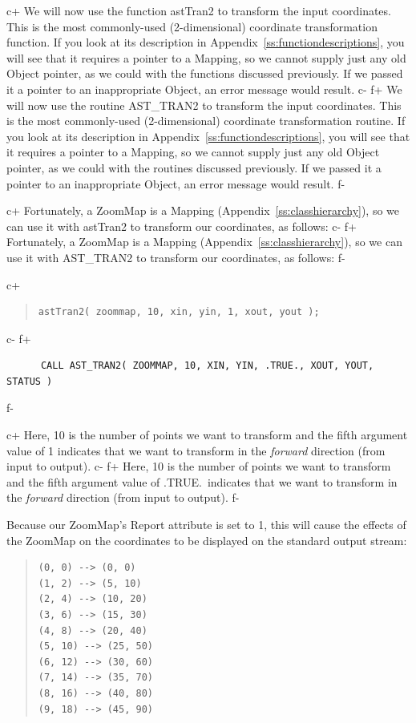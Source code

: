 \documentclass[twoside,11pt]{article}
\newcommand{\appref}[1]{Appendix~\ref{#1}}
\newcommand{\appref}[1]{\ref{#1}}
\begin{document}
c+
We will now use the function astTran2 to transform the input
coordinates. This is the most commonly-used (2-dimensional) coordinate
transformation function. If you look at its description in
\appref{ss:functiondescriptions}, you will see that it requires a
pointer to a Mapping, so we cannot supply just any old Object pointer,
as we could with the functions discussed previously. If we passed it a
pointer to an inappropriate Object, an error message would result.
c-
f+
We will now use the routine AST\_TRAN2 to transform the input
coordinates. This is the most commonly-used (2-dimensional) coordinate
transformation routine. If you look at its description in
\appref{ss:functiondescriptions}, you will see that it requires a
pointer to a Mapping, so we cannot supply just any old Object pointer,
as we could with the routines discussed previously. If we passed it a
pointer to an inappropriate Object, an error message would result.
f-

c+
Fortunately, a ZoomMap is a Mapping (\appref{ss:classhierarchy}), so we
can use it with astTran2 to transform our coordinates, as follows:
c-
f+
Fortunately, a ZoomMap is a Mapping (\appref{ss:classhierarchy}), so we
can use it with AST\_TRAN2 to transform our coordinates, as follows:
f-

c+
\begin{quote}
\small
\begin{verbatim}
astTran2( zoommap, 10, xin, yin, 1, xout, yout );
\end{verbatim}
\normalsize
\end{quote}
c-
f+
\small
\begin{verbatim}
      CALL AST_TRAN2( ZOOMMAP, 10, XIN, YIN, .TRUE., XOUT, YOUT, STATUS )
\end{verbatim}
\normalsize
f-

c+
Here, 10 is the number of points we want to transform and the fifth
argument value of 1 indicates that we want to transform in the
{\em{forward}} direction (from input to output).
c-
f+
Here, 10 is the number of points we want to transform and the fifth
argument value of .TRUE.\ indicates that we want to transform in the
{\em{forward}} direction (from input to output).
f-

Because our ZoomMap's Report attribute is set to 1, this will cause
the effects of the ZoomMap on the coordinates to be displayed on the
standard output stream:

\begin{quote}
\small
\begin{verbatim}
(0, 0) --> (0, 0)
(1, 2) --> (5, 10)
(2, 4) --> (10, 20)
(3, 6) --> (15, 30)
(4, 8) --> (20, 40)
(5, 10) --> (25, 50)
(6, 12) --> (30, 60)
(7, 14) --> (35, 70)
(8, 16) --> (40, 80)
(9, 18) --> (45, 90)
\end{verbatim}
\normalsize
\end{quote}
\end{document}
